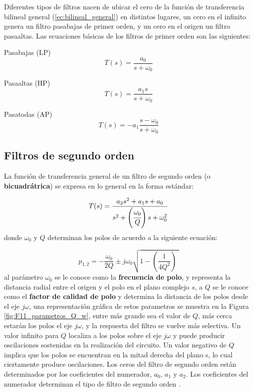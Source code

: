 	Diferentes tipos de filtros nacen de ubicar el cero de la función de transferencia bilineal general (\ref{ec:bilineal_general}) en distintos lugares, un cero en el infinito genera un filtro pasabajas de primer orden, y un cero en el origen un filtro pasaaltas. Las ecuaciones básicas de los filtros de primer orden son las siguientes:
	
	Pasabajas (LP)
	\begin{equation}
	T(s) = \frac{a_{0}}{s + \omega_{0}}
	\end{equation}
	
	Pasaaltas (HP)
	\begin{equation}
	T(s) = \frac{a_{1}s}{s + \omega_{0}}
	\end{equation}
	
	Pasatodas (AP)
	\begin{equation}
	T(s) = -a_{1} \frac{s - \omega_{0}}{s + \omega_{0}}
	\end{equation}
	
	\subsection{Filtros de segundo orden}
	
	La función de transferencia general de un filtro de segundo orden (o \textbf{bicuadrátrica}) se expresa en lo general en la forma estándar:
	
	\begin{equation}
	T(s) = \frac{a_{2} s^{2} + a_{1}s + a_{0}}{s^{2} + \left( \cfrac{ \omega_{0} }{Q} \right)s + \omega_{0}^{2}}
	\end{equation}
	donde $\omega_{0}$ y $Q$ determinan los polos de acuerdo a la siguiente ecuación:
	
	\begin{equation}
	p_{1,2} = - \frac{\omega_{0}}{2 Q} \pm j \omega_{0} \sqrt{1 - \left(   \frac{1}{4 Q^{2}}  \right) \,\,}
	\end{equation}
	al parámetro $\omega_{0}$ se le conoce como la \textbf{frecuencia de polo}, y representa la distancia radial entre el origen y el polo en el plano complejo $s$, a $Q$ se le conoce como el \textbf{factor de calidad de polo} y determina la distancia de los polos desde el eje $j\omega$, una representación gráfica de estos parametros se muestra en la Figura \ref{fig:F11_parametros_Q_w}, entre más grande sea el valor de $Q$, más cerca estarán los polos el eje $j\omega$, y la respuesta del filtro se vuelve más selectiva. Un valor infinito para $Q$ localiza a los polos sobre el eje $j\omega$ y puede producir oscilaciones sostenidas en la realización del circuito. Un valor negativo de $Q$ implica que los polos se encuentran en la mitad derecha del plano s, lo cual ciertamente produce oscilaciones.
	Los ceros del filtro de segundo orden están determinados por los coeficientes del numerador, $a_{0}$, $a_{1}$ y $a_{2}$. Los coeficientes del numerador determinan el tipo de filtro de segundo orden \cite{Sedra2015}.
	
